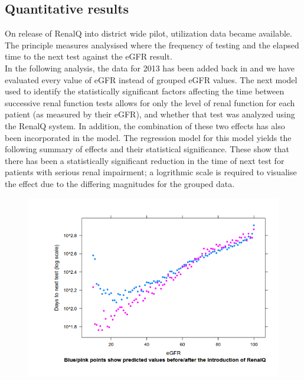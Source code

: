\documentclass[11pt,a4paper]{article}
\begin{document}
\subsection{Quantitative results}
On release of RenalQ into district wide pilot, utilization data became available. The principle measures analysised where the frequency of testing and the elapsed time to the next test against the eGFR result.\\

In the following analysis, the data for 2013 has been added back in and we have evaluated every value of eGFR instead of grouped eGFR values. The next  model  used to identify the statistically significant factors affecting the time between successive renal function tests allows for only the level of renal function for each patient (as measured by their eGFR), and whether that test was analyzed using the RenalQ system. In addition, the combination of these two effects has also been incorporated in the model. The regression model for this model yields  the following summary of effects and their statistical significance. These show that there has been a statistically significant reduction in the time of next test for patients with serious renal impairment; a logrithmic scale is required to visualise the effect due to the differing magnitudes for the grouped data.\\

\begin{figure}[htp]
\centering
\includegraphics[scale=0.50]{FigCritical.png}
\caption{}
\label{}
\end{figure}
\end{document}
